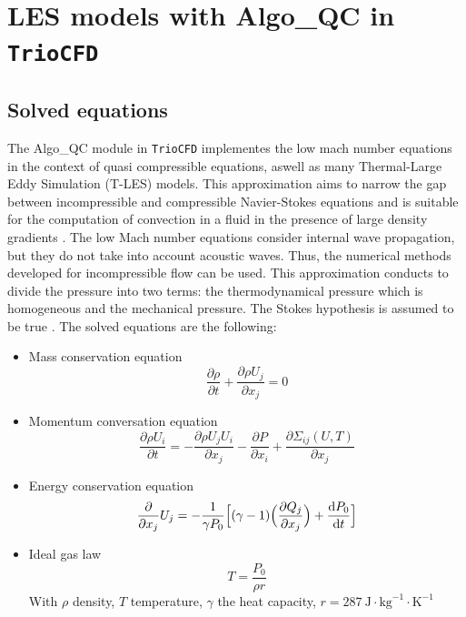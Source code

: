 

\chapter{LES models with Algo\_QC in \texttt{TrioCFD}}
\section{Solved equations}
The Algo\_QC module in \texttt{TrioCFD} implementes the low mach number equations in the context of quasi compressible equations, aswell as many Thermal-Large Eddy Simulation (T-LES) models.  This approximation aims to narrow the gap between incompressible and compressible Navier-Stokes equations and is suitable for the computation of convection in a fluid in the presence of large density gradients \cite{paolucci_filtering_1982}. The low Mach number equations consider internal wave propagation, but they do not take into account acoustic waves. Thus, the numerical methods developed for incompressible flow can be used. This approximation conducts to divide the pressure into two terms: the thermodynamical pressure which is homogeneous and the mechanical pressure. The Stokes hypothesis is assumed to be true \cite{Papalexandris2019}. The solved equations are the following:



\begin{itemize}
    \item Mass conservation equation
        \begin{equation}
            \frac{\partial \rho}{\partial t} + \frac{\partial \rho U_j}{\partial x_j} = 0
            \label{eq:mass_conserv}
        \end{equation}
    
    \item Momentum conversation equation
    \begin{equation}
        \frac{
            \partial \rho U_i
        }{
            \partial t
        } = - \frac{
            \partial \rho U_j U_i
        }{
            \partial x_j
        } - \frac{\partial P}{\partial x_i} + \frac{\partial \Sigma_{ij}(U, T)}{\partial x_j}
        \label{eq:moment_conserv}
    \end{equation}
    
    \item Energy conservation equation
    \begin{equation}
        \frac{
            \partial
        }{
            \partial x_j
        } U_j = - \frac{1}{\gamma P_0} \Big[  (\gamma -1) \Big( \frac{\partial Q_j }{\partial x_j} \Big) + \frac{\mathrm{d} P_0}{\mathrm{d} t}\Big]
        \label{eq:ener_conserv}
    \end{equation}
    
    \item Ideal gas law
    \begin{equation}
        T = \frac{P_0}{\rho r}
        \label{eq:ideal_gas}
    \end{equation}
    With $\rho$ density, $T$ temperature, $\gamma$ the heat capacity, $r=287 \ \text{J} \cdot \text{kg}^{-1} \cdot \text{K}^{-1}$
\end{itemize}

